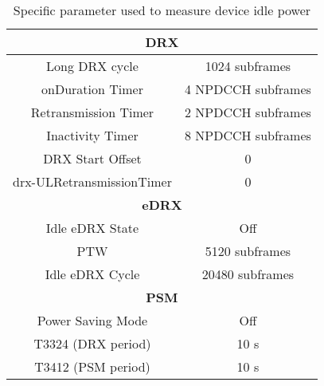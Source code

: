 \begin{table}[H]
\centering
\begin{tabular}{|c|c|} \hline
\multicolumn{2}{|c|}{\textbf{DRX}}  	 \\ \hline
Long DRX cycle     	& 1024 subframes 	 \\ \hline
onDuration Timer   	& 4 NPDCCH subframes \\ \hline
Retransmission Timer & 2 NPDCCH subframes \\ \hline
Inactivity Timer   	& 8 NPDCCH subframes \\ \hline
DRX Start Offset   	& 0              	 \\ \hline
drx-ULRetransmissionTimer & 0       	 \\ \hline
\multicolumn{2}{|c|}{\textbf{eDRX}} 	 \\ \hline
Idle eDRX State		& Off				 \\ \hline
\gls{PTW}			& 5120 subframes 	 \\ \hline
Idle eDRX Cycle     & 20480 subframes	 \\ \hline
\multicolumn{2}{|c|}{\textbf{PSM}}  	 \\ \hline
Power Saving Mode	& Off				 \\ \hline
T3324 (DRX period)	& 10 s    			 \\ \hline
T3412 (PSM period)	& 10 s		  		 \\ \hline
\end{tabular}
\caption{Specific parameter used to measure device idle power}
\label{tab:UXM_idle_values}
\end{table}




